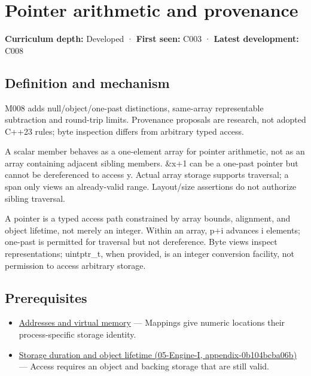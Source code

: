\hypertarget{appendix-6af5921bc853}{}
\section{Pointer arithmetic and provenance}\label{appendix-6af5921bc853-pointer-arithmetic-and-provenance}

\textbf{Curriculum depth:} Developed · \textbf{First seen:} C003 · \textbf{Latest development:} C008

\subsection{Definition and mechanism}\label{appendix-6af5921bc853-definition-and-mechanism}

M008 adds null/object/one-past distinctions, same-array representable subtraction and round-trip limits. Provenance proposals are research, not adopted C++23 rules; byte inspection differs from arbitrary typed access.

A scalar member behaves as a one-element array for pointer arithmetic, not as an array containing adjacent sibling members. \&x+1 can be a one-past pointer but cannot be dereferenced to access y. Actual array storage supports traversal; a span only views an already-valid range. Layout/size assertions do not authorize sibling traversal.

A pointer is a typed access path constrained by array bounds, alignment, and object lifetime, not merely an integer. Within an array, p+i advances i elements; one-past is permitted for traversal but not dereference. Byte views inspect representations; uintptr\_t, when provided, is an integer conversion facility, not permission to access arbitrary storage.

\subsection{Prerequisites}\label{appendix-6af5921bc853-prerequisites}

\begin{itemize}
\tightlist
\item
  \hyperref[appendix-18ee4f913c3c]{Addresses and virtual memory} --- Mappings give numeric locations their process-specific storage identity.
\item
  \href{../05-Engine-I/main.pdf\#nameddest=appendix-0b104bcba06b}{Storage duration and object lifetime (05-Engine-I, appendix-0b104bcba06b)} --- Access requires an object and backing storage that are still valid.
\end{itemize}

